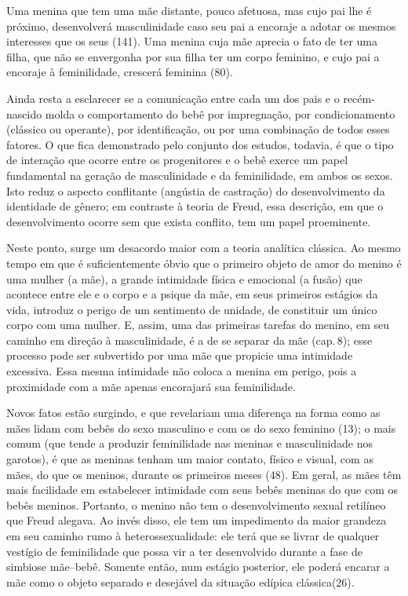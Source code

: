  Uma menina que tem uma mãe distante, pouco afetuosa, mas cujo pai lhe é
próximo, desenvolverá masculinidade\idxpaismasc{} caso\idxmascumen{} seu pai a encoraje a adotar os
mesmos interesses que os seus (141). Uma menina cuja mãe aprecia o fato
de ter uma filha, que não se envergonha por sua filha ter um corpo
feminino, e cujo pai a encoraje à feminilidade, crescerá feminina (80).

 Ainda resta a esclarecer se a comunicação entre cada um dos pais e o
recém-nascido molda o comportamento do bebê por impregnação, por
condicionamento (clássico ou operante), por identificação, ou por uma
combinação de todos esses fatores. O que fica demonstrado pelo conjunto
dos estudos, todavia, é que o tipo de interação que ocorre entre os
progenitores e o bebê exerce um papel fundamental na geração de
masculinidade e da feminilidade, em ambos os sexos. Isto reduz o
aspecto conflitante (angústia de castração)\idxcastaconf{} do desenvolvimento da
identidade de gênero; em contraste à teoria de Freud, essa descrição,
em que o desenvolvimento ocorre sem que exista conflito, tem um papel
proeminente.

 Neste ponto, surge um desacordo maior com a teoria analítica clássica.
Ao mesmo tempo em que é suficientemente óbvio que o primeiro objeto de
amor do menino é uma mulher (a mãe), a grande intimidade física e
\mbox{emocional} (a fusão) que acontece entre ele e o corpo e a psique da mãe,
 em seus primeiros estágios da vida, introduz o perigo de um sentimento
de unidade, de constituir um único corpo com uma mulher. E, assim, uma
das primeiras tarefas do menino, em seu caminho em direção à
masculinidade, é a de se separar da mãe (cap.\,8); esse processo pode
ser subvertido por uma mãe que propicie uma intimidade excessiva. Essa
mesma intimidade não coloca a menina em perigo, pois a proximidade com
a mãe apenas encorajará sua feminilidade.

 Novos fatos estão surgindo, e que revelariam uma diferença na forma
como as mães lidam com bebês do sexo masculino e com os do sexo
feminino (13); o mais comum (que tende a produzir feminilidade nas
meninas e masculinidade nos garotos), é que as meninas tenham um maior
contato, físico e visual, com as mães, do que os meninos, durante os
primeiros meses (48). Em geral, as mães têm mais facilidade em
estabelecer intimidade com seus bebês meninas do que com os bebês
meninos. Portanto, o menino não tem o desenvolvimento sexual retilíneo que Freud alegava. Ao invés disso, ele tem um impedimento da maior grandeza em seu caminho rumo à heterossexualidade: ele terá que se livrar de qualquer vestígio de feminilidade que possa vir a ter desenvolvido durante a fase de simbiose mãe--bebê. Somente então, num estágio posterior, ele poderá encarar a mãe como o objeto separado e
desejável da situação edípica clássica\idxmaesdese[|)] (26).

